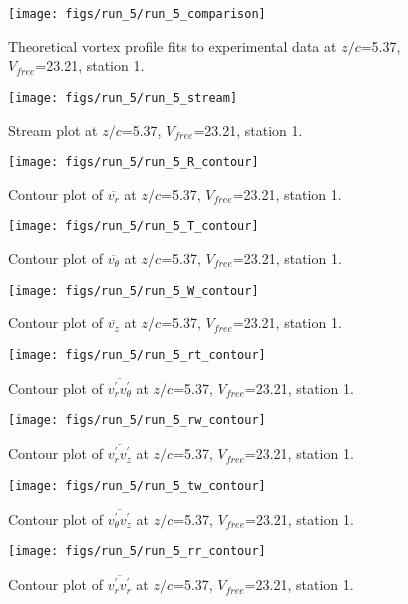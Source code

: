 \begin{figure}[H]
\centering
\texttt{[image: figs/run\_5/run\_5\_comparison]}
\caption{Theoretical vortex profile fits to experimental data at $z/c$=5.37, $V_{free}$=23.21, station 1.}
\end{figure}


\begin{figure}[H]
\centering
\texttt{[image: figs/run\_5/run\_5\_stream]}
\caption{Stream plot at $z/c$=5.37, $V_{free}$=23.21, station 1.}
\end{figure}


\begin{figure}[H]
\centering
\texttt{[image: figs/run\_5/run\_5\_R\_contour]}
\caption{Contour plot of $\overline{v_{r}}$ at $z/c$=5.37, $V_{free}$=23.21, station 1.}
\end{figure}


\begin{figure}[H]
\centering
\texttt{[image: figs/run\_5/run\_5\_T\_contour]}
\caption{Contour plot of $\overline{v_{\theta}}$ at $z/c$=5.37, $V_{free}$=23.21, station 1.}
\end{figure}


\begin{figure}[H]
\centering
\texttt{[image: figs/run\_5/run\_5\_W\_contour]}
\caption{Contour plot of $\overline{v_{z}}$ at $z/c$=5.37, $V_{free}$=23.21, station 1.}
\end{figure}


\begin{figure}[H]
\centering
\texttt{[image: figs/run\_5/run\_5\_rt\_contour]}
\caption{Contour plot of $\overline{v_{r}^{\prime} v_{\theta}^{\prime}}$ at $z/c$=5.37, $V_{free}$=23.21, station 1.}
\end{figure}


\begin{figure}[H]
\centering
\texttt{[image: figs/run\_5/run\_5\_rw\_contour]}
\caption{Contour plot of $\overline{v_{r}^{\prime} v_{z}^{\prime}}$ at $z/c$=5.37, $V_{free}$=23.21, station 1.}
\end{figure}


\begin{figure}[H]
\centering
\texttt{[image: figs/run\_5/run\_5\_tw\_contour]}
\caption{Contour plot of $\overline{v_{\theta}^{\prime} v_{z}^{\prime}}$ at $z/c$=5.37, $V_{free}$=23.21, station 1.}
\end{figure}


\begin{figure}[H]
\centering
\texttt{[image: figs/run\_5/run\_5\_rr\_contour]}
\caption{Contour plot of $\overline{v_{r}^{\prime} v_{r}^{\prime}}$ at $z/c$=5.37, $V_{free}$=23.21, station 1.}
\end{figure}


